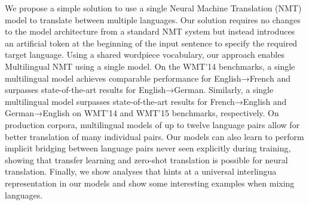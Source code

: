 We propose a simple solution to use a single Neural Machine Translation (NMT) model to translate between multiple languages. Our solution requires no changes to the model architecture from a standard NMT system but instead introduces an artificial token at the beginning of the input sentence to specify the required target language. Using a shared wordpiece vocabulary, our approach enables Multilingual NMT using a single model. On the WMT'14 benchmarks, a single multilingual model achieves comparable performance for English→French and surpasses state-of-the-art results for English→German. Similarly, a single multilingual model surpasses state-of-the-art results for French→English and German→English on WMT'14 and WMT'15 benchmarks, respectively. On production corpora, multilingual models of up to twelve language pairs allow for better translation of many individual pairs. Our models can also learn to perform implicit bridging between language pairs never seen explicitly during training, showing that transfer learning and zero-shot translation is possible for neural translation. Finally, we show analyses that hints at a universal interlingua representation in our models and show some interesting examples when mixing languages.
